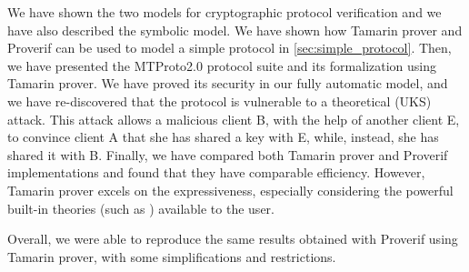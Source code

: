 We have shown the two models for cryptographic protocol verification and we have also described the symbolic model. We have shown how Tamarin prover and Proverif can be used to model a simple protocol in \cref{sec:simple_protocol}. Then, we have presented the MTProto2.0 protocol suite and its formalization using Tamarin prover. We have proved its security in our fully automatic model, and we have re-discovered that the protocol is vulnerable to a theoretical \uks{} (UKS) attack. This attack allows a malicious client B, with the help of another client E, to convince client A that she has shared a key with E, while, instead, she has shared it with B. Finally, we have compared both Tamarin prover and Proverif implementations and found that they have comparable efficiency. However, Tamarin prover excels on the expressiveness, especially considering the powerful built-in theories (such as \DiHe{}) available to the user.

Overall, we were able to reproduce the same results obtained with Proverif using Tamarin prover, with some simplifications and restrictions.